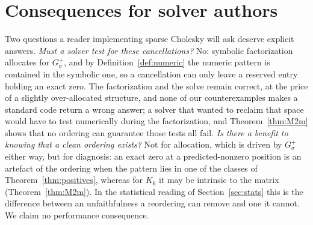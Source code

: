 \documentclass[11pt]{article}
\theoremstyle{plain}
\theoremstyle{definition}
\begin{document}
\section{Consequences for solver authors}\label{sec:practical}
\begin{humanblock}
Two questions a reader implementing sparse Cholesky will ask deserve explicit answers. \emph{Must a
solver test for these cancellations?} No: symbolic factorization allocates for $G^+_\sigma$, and by
Definition~\ref{def:numeric} the numeric pattern is contained in the symbolic one, so a cancellation
can only leave a reserved entry holding an exact zero. The factorization and the solve remain correct,
at the price of a slightly over-allocated structure, and none of our counterexamples makes a standard
code return a wrong answer; a solver that wanted to reclaim that space would have to test numerically
during the factorization, and Theorem~\ref{thm:M2m} shows that no ordering can guarantee those tests
all fail. \emph{Is there a benefit to knowing that a clean ordering exists?} Not for allocation, which
is driven by $G^+_\sigma$ either way, but for diagnosis: an exact zero at a predicted-nonzero position
is an artefact of the ordering when the pattern lies in one of the classes of
Theorem~\ref{thm:positives}, whereas for $K_6$ it may be intrinsic to the matrix
(Theorem~\ref{thm:M2m}). In the statistical reading of Section~\ref{sec:stats} this is the difference
between an unfaithfulness a reordering can remove and one it cannot. We claim no performance
consequence.
\end{humanblock}
\end{document}
